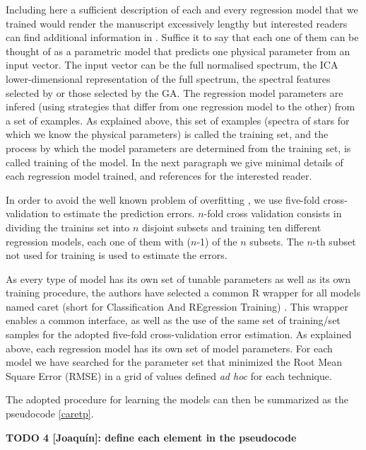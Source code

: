 Including here a sufficient description of each and every regression
model that we trained would render the manuscript excessively lengthy
but interested readers can find additional information in
\cite{baraud2002model,geman1992neural,elith2008working,meyer2003support,svetnik2003random}. Suffice it to say that each one of them can be thought of as
a parametric model that predicts one physical parameter from an input
vector. The input vector can be the full normalised spectrum, the ICA
lower-dimensional representation of the full spectrum, the spectral
features selected by \cite{cesetti} or those selected by the GA. The
regression model parameters are infered (using strategies that differ
from one regression model to the other) from a set of examples. As
explained above, this set of examples (spectra of stars for which we
know the physical parameters) is called the training set, and the
process by which the model parameters are determined from the training
set, is called training of the model. In the next paragraph we give
minimal details of each regression model trained, and references for
the interested reader.

In order to avoid the well known problem of overfitting \cite[see
e.g.][]{Dietterich:1995:OUM:212094.212114}, we use five-fold
cross-validation to estimate the prediction errors. $n$-fold cross
validation consists in dividing the trainins set into $n$ disjoint
subsets and training ten different regression models, each one of them
with ($n$-1) of the $n$ subsets. The $n$-th subset not used for
training is used to estimate the errors.

As every type of model has its own set of tunable parameters as well
as its own training procedure, the authors have selected a common
R \cite{R2016} wrapper for all models named caret (short for
Classification And REgression Training) \cite{caret}.  This wrapper
enables a common interface, as well as the use of the same set of
training/set samples for the adopted five-fold cross-validation error
estimation. As explained above, each regression model has its own set
of model parameters. For each model we have searched for the parameter
set that minimized the Root Mean Square Error (RMSE) in a grid of
values defined {\it ad hoc} for each technique.

The adopted procedure for learning the models can then be summarized
as the pseudocode \ref{caretp}.

{\bf TODO 4 [Joaquín]: define each element in the pseudocode}

